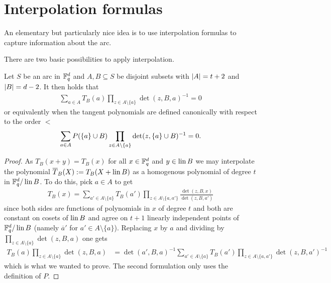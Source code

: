 \documentclass[a4paper]{article}
\begin{document}
\section{Interpolation formulas}

An elementary but particularly nice idea is to use interpolation
formulas to capture information about the arc.

There are two basic possibilities to apply interpolation. 

\begin{lemma}
  Let $S$ be an arc in $\mathbb{F}_{q}^d$ and $A,B\subseteq S$ be disjoint subsets with
  $\left|A\right|=t+2$ and $\left|B\right|=d-2$. It then holds that
  \begin{align}
    \sum_{a\in A}{T_{B}(a)\prod_{z\in A\setminus \{a\}}\det(z,B,a)^{-1}} =0
  \end{align}
  or equivalently when the tangent polynomials are defined canonically
  with respect to the order $<$
  \begin{align}
    \sum_{a\in A}{P(\{a\}\cup B)\prod_{z\in A\setminus\{a\}}\det(z,\{a\}\cup B)^{-1}}=0\text{.}
  \end{align}
\end{lemma}

\begin{proof}
  As $T_B(x+y)=T_B(x)$ for all $x\in\mathbb{F}_{q}^d$ and $y\in\mathop\mathrm{lin}{B}$ we may
  interpolate the polynomial $\overline{T}_B(X):=T_{B}(X+\mathop\mathrm{lin}{B})$ as a homogenous polynomial of
  degree $t$ in $\mathbb{F}_{q}^d/\mathop\mathrm{lin}{B}$. To do this, pick $a\in A$ to get
  \begin{align}
    T_B(x)=\sum_{a'\in A\setminus\{a\}}{T_B(a')\prod_{z\in A\setminus\{a,a'\}}{\frac{\det(z,B,x)}{\det(z,B,a')}}}
  \end{align}
  since both sides are functions of polynomials in $x$ of degree $t$
  and both are constant on cosets of $\mathop\mathrm{lin}{B}$ and agree on $t+1$
  linearly independent points of $\mathbb{F}_{q}^d/\mathop\mathrm{lin}{B}$ (namely $\overline{a}'$
  for $a'\in A\setminus\{a\}$). Replacing $x$ by $a$ and dividing by
  $\prod_{z\in A\setminus\{a\}}{\det(z,B,a)}$ one gets 
  \begin{align}
    T_B(a)\prod_{z\in  A\setminus\{a\}}{\det(z,B,a)} 
    &= \det(a',B,a)^{-1}\sum_{a'\in A\setminus\{a\}}{T_B(a')\prod_{z\in A\setminus\{a,a'\}}{\det(z,B,a')^{-1}}}
  \end{align}
  which is what we wanted to prove.
  The second formulation only uses the definition of $P$.
\end{proof}
\end{document}

